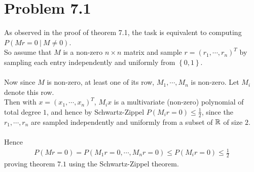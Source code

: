 \section*{Problem 7.1}
As observed in the proof of theorem 7.1, the task is equivalent to
computing $P(Mr=0 \ | \ M \neq 0)$. \\
So assume that $M$ is a non-zero $n \times n$ matrix and sample $r=(r_1,\cdots,r_n)^T$
by sampling each entry independently and uniformly from $\left\{ 0,1 \right\}$. \\ \\
Now since $M$ is non-zero, at least one of its row, $M_1,\cdots,M_n$ is non-zero.
Let $M_i$ denote this row. \\
Then with $x=(x_1,\cdots,x_n)^T$, $M_ix$ is a multivariate (non-zero) polynomial of total degree $1$,
and hence by Schwartz-Zippel $P\left( M_ir=0 \right) \leq \frac{1}{2}$,
since the $r_1,\cdots,r_n$ are sampled independently and uniformly from a subset of $\mathbb{R}$ of size $2$. \\ \\
Hence 
\begin{align*}
	P\left( Mr=0 \right)=P\left( M_1r=0,\cdots,M_nr=0 \right) \leq P\left( M_ir=0 \right) \leq \frac{1}{2}
\end{align*}
proving theorem $7.1$ using the Schwartz-Zippel theorem.

